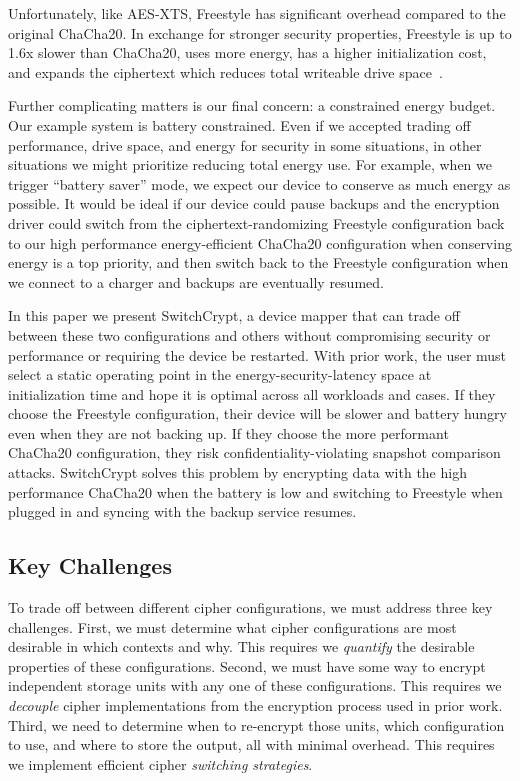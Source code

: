 Unfortunately, like AES-XTS, Freestyle has significant overhead compared to the
original ChaCha20. In exchange for stronger security properties, Freestyle is up
to 1.6x slower than ChaCha20, uses more energy, has a higher initialization
cost, and expands the ciphertext which reduces total writeable drive
space~\cite{Freestyle}.





Further complicating matters is our final concern: a constrained energy budget.
Our example system is battery constrained. Even if we accepted trading off
performance, drive space, and energy for security in some situations, in other
situations we might prioritize reducing total energy use. For example, when we
trigger ``battery saver'' mode, we expect our device to conserve as much energy
as possible. It would be ideal if our device could pause backups and the
encryption driver could switch from the ciphertext-randomizing Freestyle
configuration back to our high performance energy-efficient ChaCha20
configuration when conserving energy is a top priority, and then switch back to
the Freestyle configuration when we connect to a charger and backups are
eventually resumed.

In this paper we present SwitchCrypt, a device mapper that can trade off between
these two configurations and others without compromising security or performance
or requiring the device be restarted. With prior work, the user must select a
static operating point in the energy-security-latency space at initialization
time and hope it is optimal across all workloads and cases. If they choose the
Freestyle configuration, their device will be slower and battery hungry even
when they are not backing up. If they choose the more performant ChaCha20
configuration, they risk confidentiality-violating snapshot comparison attacks.
SwitchCrypt solves this problem by encrypting data with the high performance
ChaCha20 when the battery is low and switching to Freestyle when plugged in and
syncing with the backup service resumes.




\subsection{Key Challenges} %

To trade off between different cipher configurations, we must address three key
challenges. First, we must determine what cipher configurations are most
desirable in which contexts and why. This requires we \emph{quantify} the
desirable properties of these configurations. Second, we must have some way to
encrypt independent storage units with any one of these configurations. This
requires we \emph{decouple} cipher implementations from the encryption process
used in prior work. Third, we need to determine when to re-encrypt those units,
which configuration to use, and where to store the output, all with minimal
overhead. This requires we implement efficient cipher \emph{switching
strategies}.

